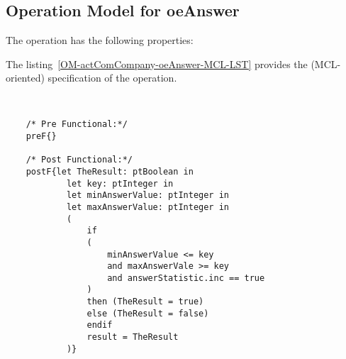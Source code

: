 \subsection{Operation Model for oeAnswer}

\label{OM-oeAnswer}


The  operation has the following properties:

	\begin{operationmodel}



		


	\end{operationmodel}



	\vspace{1cm}
	The listing~\ref{OM-actComCompany-oeAnswer-MCL-LST} provides the \msrmessir (MCL-oriented) specification of the operation.
	
	\scriptsize
	\vspace{0.5cm}
	\begin{lstlisting}[style=MessirStyle,firstnumber=auto,captionpos=b,caption={\msrmessir (MCL-oriented) specification of the operation \emph{oeAnswer}.},label=OM-actComCompany-oeAnswer-MCL-LST]

	
	/* Pre Functional:*/
	preF{}
	
	/* Post Functional:*/ 
	postF{let TheResult: ptBoolean in
			let key: ptInteger in
			let minAnswerValue: ptInteger in
			let maxAnswerValue: ptInteger in
			(
				if 
				(
					minAnswerValue <= key
					and maxAnswerVale >= key
					and answerStatistic.inc == true
				)
				then (TheResult = true)
		        else (TheResult = false)
		        endif
		        result = TheResult
			)}
	
	
	\end{lstlisting}
	\normalsize 
	
	
	
	





